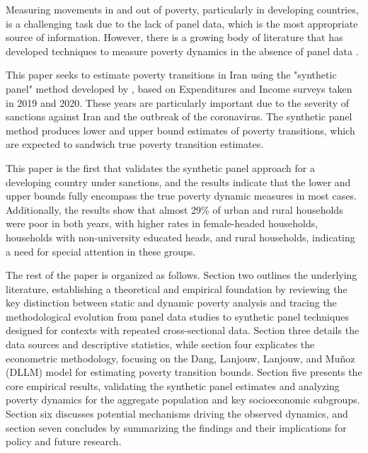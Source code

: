 \documentclass[12pt,a4paper]{article}
\begin{document}
 
Measuring movements in and out of poverty, particularly in developing countries, is a challenging task due to the lack of panel data, which is the most appropriate source of information. However, there is a growing body of literature that has developed techniques to measure poverty dynamics in the absence of panel data \citep{cruces2015estimating}. \par

This paper seeks to estimate poverty transitions in Iran using the "synthetic panel" method developed by \citep{dang2014using}, based on Expenditures and Income surveys taken in 2019 and 2020. These years are particularly important due to the severity of sanctions against Iran and the outbreak of the coronavirus. The synthetic panel method produces lower and upper bound estimates of poverty transitions, which are expected to sandwich true poverty transition estimates.\par
This paper is the first that validates the synthetic panel approach for a developing country under sanctions, and the results indicate that the lower and upper bounds fully encompass the true poverty dynamic measures in most cases. Additionally, the results show that almost 29\% of urban and rural households were poor in both years, with higher rates in female-headed households, households with non-university educated heads, and rural households, indicating a need for special attention in these groups.\par
The rest of the paper is organized as follows. Section two outlines the underlying literature, establishing a theoretical and empirical foundation by reviewing the key distinction between static and dynamic poverty analysis and tracing the methodological evolution from panel data studies to synthetic panel techniques designed for contexts with repeated cross-sectional data. Section three details the data sources and descriptive statistics, while section four explicates the econometric methodology, focusing on the Dang, Lanjouw, Lanjouw, and Muñoz (DLLM) model for estimating poverty transition bounds. Section five presents the core empirical results, validating the synthetic panel estimates and analyzing poverty dynamics for the aggregate population and key socioeconomic subgroups. Section six discusses potential mechanisms driving the observed dynamics, and section seven concludes by summarizing the findings and their implications for policy and future research.
\end{document}
